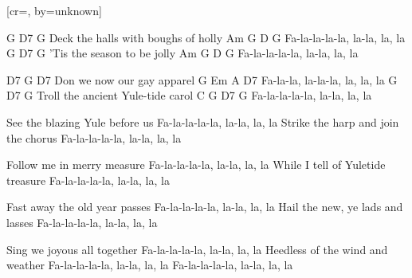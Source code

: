 
    [cr={}, by={unknown}]

    \beginverse

    G D7 G
    Deck the halls with boughs of holly
    Am G D G
    Fa-la-la-la-la, la-la, la, la
    G D7 G
    ’Tis the season to be jolly
    Am G D G
    Fa-la-la-la-la, la-la, la, la

    D7 G D7
    Don we now our gay apparel
    G Em A D7
    Fa-la-la, la-la-la, la, la, la
    G D7 G
    Troll the ancient Yule-tide carol
    C G D7 G
    Fa-la-la-la-la, la-la, la, la

    See the blazing Yule before us
    Fa-la-la-la-la, la-la, la, la
    Strike the harp and join the chorus
    Fa-la-la-la-la, la-la, la, la

    Follow me in merry measure
    Fa-la-la-la-la, la-la, la, la
    While I tell of Yuletide treasure
    Fa-la-la-la-la, la-la, la, la

    Fast away the old year passes
    Fa-la-la-la-la, la-la, la, la
    Hail the new, ye lads and lasses
    Fa-la-la-la-la, la-la, la, la

    Sing we joyous all together
    Fa-la-la-la-la, la-la, la, la
    Heedless of the wind and weather
    Fa-la-la-la-la, la-la, la, la
    Fa-la-la-la-la, la-la, la, la


    \endverse

    \endsong


